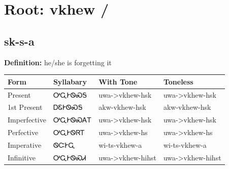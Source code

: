 \documentclass{article}%
\begin{document}
%
\normalsize%
\section*{Root: vkhew / }%
\subsection*{sk-s-a}%
\textbf{Definition: }%
he/she is forgetting it%
\\[0.5em]%
\begin{tabular}{|l|l|l|l|}%
\hline%
\textbf{Form}&\textbf{Syllabary}&\textbf{With Tone}&\textbf{Toneless}\\%
\hline%
Present&ᎤᏩᎨᏫᏍᎦ&uwa{-}>vkhew{-}hsk&uwa{-}>vkhew{-}hsk\\%
1st Present&ᎠᏋᎨᏫᏍᎦ&akw{-}vkhew{-}hsk&akw{-}vkhew{-}hsk\\%
Imperfective&ᎤᏩᎨᏫᏍᎪᎢ&uwa{-}>vkhew{-}hsk&uwa{-}>vkhew{-}hsk\\%
Perfective&ᎤᏩᎨᏫᏒᎢ&uwa{-}>vkhew{-}hs&uwa{-}>vkhew{-}hs\\%
Imperative&ᏫᏨᎨᏩ&wi{-}ts{-}vkhew{-}a&wi{-}ts{-}vkhew{-}a\\%
Infinitive&ᎤᏩᎨᏫᏍᏗ&uwa{-}>vkhew{-}hihst&uwa{-}>vkhew{-}hihst\\%
\hline%
\end{tabular}%
\\[1em]%
\end{document}
